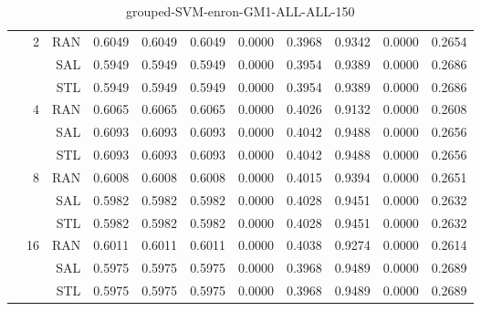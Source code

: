 \begin{center}
\begin{table}[htbp]
\begin{center}
\begin{tabular}{ | r | r | r | r | r | r | r | r | r | r | r |}
 & \multirow{3}{*}{2} & RAN & 0.6049 & 0.6049 & 0.6049 & 0.0000 & 0.3968 & 0.9342 & 0.0000 & 0.2654\\ \cline{3-11}
 &   & SAL & 0.5949 & 0.5949 & 0.5949 & 0.0000 & 0.3954 & 0.9389 & 0.0000 & 0.2686\\ \cline{3-11}
 &   & STL & 0.5949 & 0.5949 & 0.5949 & 0.0000 & 0.3954 & 0.9389 & 0.0000 & 0.2686\\ \cline{2-11}
 & \multirow{3}{*}{4} & RAN & 0.6065 & 0.6065 & 0.6065 & 0.0000 & 0.4026 & 0.9132 & 0.0000 & 0.2608\\ \cline{3-11}
 &   & SAL & 0.6093 & 0.6093 & 0.6093 & 0.0000 & 0.4042 & 0.9488 & 0.0000 & 0.2656\\ \cline{3-11}
 &   & STL & 0.6093 & 0.6093 & 0.6093 & 0.0000 & 0.4042 & 0.9488 & 0.0000 & 0.2656\\ \cline{2-11}
 & \multirow{3}{*}{8} & RAN & 0.6008 & 0.6008 & 0.6008 & 0.0000 & 0.4015 & 0.9394 & 0.0000 & 0.2651\\ \cline{3-11}
 &   & SAL & 0.5982 & 0.5982 & 0.5982 & 0.0000 & 0.4028 & 0.9451 & 0.0000 & 0.2632\\ \cline{3-11}
 &   & STL & 0.5982 & 0.5982 & 0.5982 & 0.0000 & 0.4028 & 0.9451 & 0.0000 & 0.2632\\ \cline{2-11}
 & \multirow{3}{*}{16} & RAN & 0.6011 & 0.6011 & 0.6011 & 0.0000 & 0.4038 & 0.9274 & 0.0000 & 0.2614\\ \cline{3-11}
 &   & SAL & 0.5975 & 0.5975 & 0.5975 & 0.0000 & 0.3968 & 0.9489 & 0.0000 & 0.2689\\ \cline{3-11}
 &   & STL & 0.5975 & 0.5975 & 0.5975 & 0.0000 & 0.3968 & 0.9489 & 0.0000 & 0.2689\\ \cline{2-11}
\hline
\end{tabular}
\caption{grouped-SVM-enron-GM1-ALL-ALL-150}
\end{center}
 \end{table}
\end{center}

